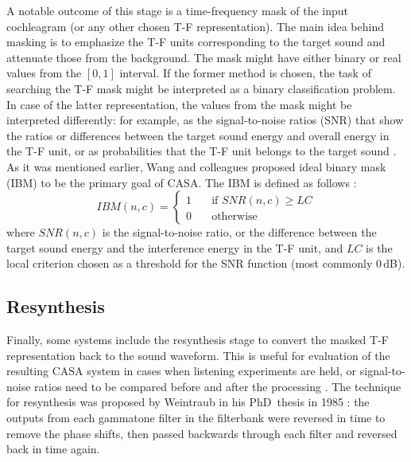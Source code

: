 A notable outcome of this stage is a time-frequency mask of the input cochleagram (or any other chosen T-F representation). The main idea behind masking is to emphasize the T-F units corresponding to the target sound and attenuate those from the background. The mask might have either binary or real values from the $[0, 1]$ interval. If the former method is chosen, the task of searching the T-F mask might be interpreted as a binary classification problem. In case of the latter representation, the values from the mask might be interpreted differently: for example, as the signal-to-noise ratios (SNR) that show the ratios or differences between the target sound energy and overall energy in the T-F unit, or as probabilities that the T-F unit belongs to the target sound \cite{Wang2006}.\\

As it was mentioned earlier, Wang and colleagues \cite{Wang2005} proposed ideal binary mask (IBM) to be the primary goal of CASA. The IBM is defined as follows \cite{Wang2006}\cite{Wang2012}:
\begin{equation}
	IBM(n, c) = 
	\begin{cases}
		1 & \quad\text{if } SNR(n, c) \ge LC \\
		0 & \quad\text{otherwise}
	\end{cases}
\end{equation}
where $SNR(n, c)$ is the signal-to-noise ratio, or the difference between the target sound energy and the interference energy in the T-F unit, and $LC$ is the local criterion chosen as a threshold for the SNR function (most commonly 0\,dB).

\subsection{Resynthesis}\label{subsection:casa_resynthesis}

Finally, some systems include the resynthesis stage to convert the masked T-F representation back to the sound waveform. This is useful for evaluation of the resulting CASA system in cases when listening experiments are held, or signal-to-noise ratios need to be compared before and after the processing \cite{Wang2006}. The technique for resynthesis was proposed by Weintraub in his PhD~thesis in 1985 \cite{Weintraub1985}: the outputs from each gammatone filter in the filterbank were reversed in time to remove the phase shifts, then passed backwards through each filter and reversed back in time again.
